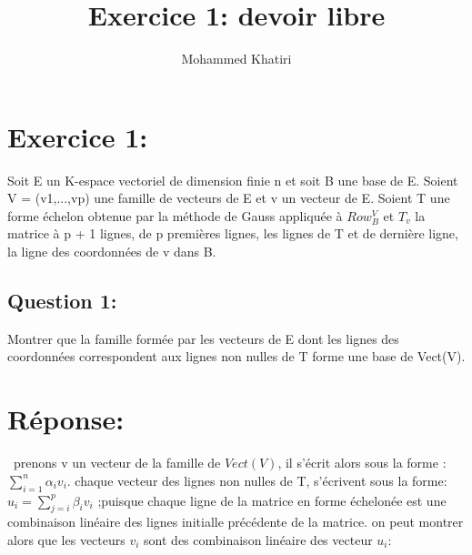 \documentclass{article}
\title{Exercice 1: devoir libre}
\author{Mohammed Khatiri}
\begin{document}
\maketitle
\newpage 

\section{Exercice 1:}

Soit E un K-espace vectoriel de dimension finie n et soit B une base de E. Soient V =
(v1,...,vp) une famille de vecteurs de E et v un vecteur de E. Soient T une forme échelon
obtenue par la méthode de Gauss appliquée à $Row^V_B$ et $T_v$ la matrice à p + 1 lignes, de p
premières lignes, les lignes de T et de dernière ligne, la ligne des coordonnées de v dans
B.

\subsection{Question 1:}

Montrer que la famille formée par les vecteurs de E dont les lignes des coordonnées
correspondent aux lignes non nulles de T forme une base de Vect(V).
\\
\section*{Réponse:}\
prenons v un vecteur de la famille de $Vect(V)$, il s'écrit alors sous la forme : $\sum_{i=1}^{n}\alpha_{i}v_{i}$.\newline
chaque vecteur des lignes non nulles de T, s'écrivent sous la forme: $u_i = \sum_{j=i}^{p}\beta_{i}v_i$ ;puisque chaque ligne de la matrice en forme échelonée est une combinaison linéaire des lignes initialle précédente de la matrice.\newline
on peut montrer alors que les vecteurs $v_i$ sont des combinaison linéaire des vecteur $u_i$:\newline
\end{document}
